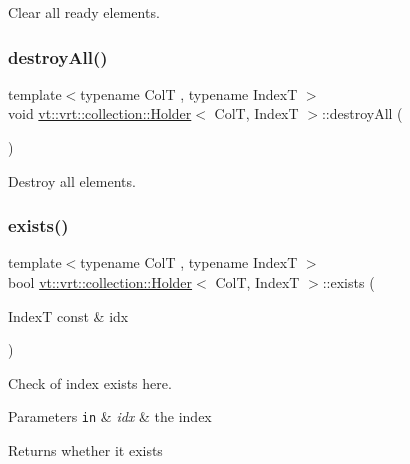 Clear all ready elements. 

\mbox{\label{structvt_1_1vrt_1_1collection_1_1_holder_ae4bd4f8f82713c8b4b2ea0b472fe7192}} 
\subsubsection{\texorpdfstring{destroy\+All()}{destroyAll()}}
{\footnotesize\ttfamily template$<$typename ColT , typename IndexT $>$ \\
void \hyperlink{structvt_1_1vrt_1_1collection_1_1_holder}{vt\+::vrt\+::collection\+::\+Holder}$<$ ColT, IndexT $>$\+::destroy\+All (\begin{DoxyParamCaption}{ }\end{DoxyParamCaption})}



Destroy all elements. 

\mbox{\label{structvt_1_1vrt_1_1collection_1_1_holder_a15b1f2f386c124191f01400fecf24464}} 
\subsubsection{\texorpdfstring{exists()}{exists()}}
{\footnotesize\ttfamily template$<$typename ColT , typename IndexT $>$ \\
bool \hyperlink{structvt_1_1vrt_1_1collection_1_1_holder}{vt\+::vrt\+::collection\+::\+Holder}$<$ ColT, IndexT $>$\+::exists (\begin{DoxyParamCaption}\item[{IndexT const \&}]{idx }\end{DoxyParamCaption})}



Check of index exists here. 


\begin{DoxyParams}[1]{Parameters}
\mbox{\tt in}  & {\em idx} & the index\\
\hline
\end{DoxyParams}
\begin{DoxyReturn}{Returns}
whether it exists 
\end{DoxyReturn}
\mbox{\label{structvt_1_1vrt_1_1collection_1_1_holder_a8d4a61cc04310a7c998fe37695bbbd6b}} 

